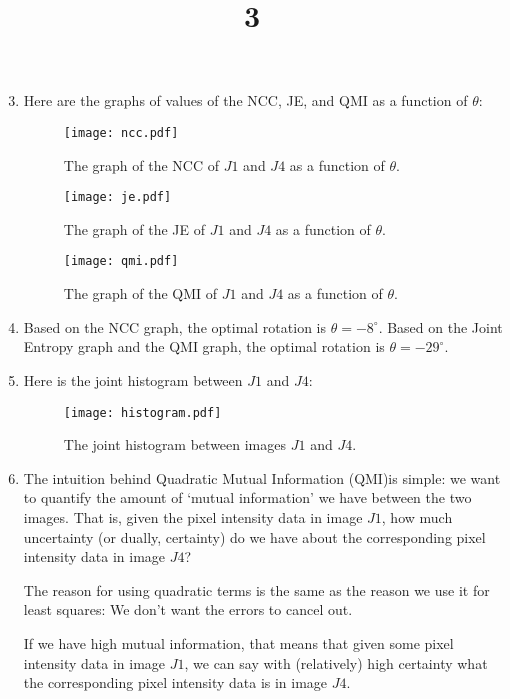 \documentclass[a4paper]{article}
\title{3}
\date{}
\begin{document}
\maketitle

\begin{enumerate}[label=(\alph*)]
\setcounter{enumi}{2}
\item Here are the graphs of values of the NCC, JE, and QMI as a function of $\theta$:
\begin{figure}[H]
\centering
\texttt{[image: ncc.pdf]}
\caption{The graph of the NCC of $J1$ and $J4$ as a function of $\theta$.}
\end{figure}

\begin{figure}[H]
\centering
\texttt{[image: je.pdf]}
\caption{The graph of the JE of $J1$ and $J4$ as a function of $\theta$.}
\end{figure}

\begin{figure}[H]
\centering
\texttt{[image: qmi.pdf]}
\caption{The graph of the QMI of $J1$ and $J4$ as a function of $\theta$.}
\end{figure}

\item Based on the NCC graph, the optimal rotation is $\theta = -8^\circ$. Based on the Joint Entropy graph and the QMI graph, the optimal rotation is $\theta = -29^\circ$.

\item Here is the joint histogram between $J1$ and $J4$:
\begin{figure}[H]
\centering
\texttt{[image: histogram.pdf]}
\caption{The joint histogram between images $J1$ and $J4$.}
\end{figure}

\item The intuition behind Quadratic Mutual Information (QMI)is simple: we want to quantify the amount of `mutual information' we have between the two images. That is, given the pixel intensity data in image $J1$, how much uncertainty (or dually, certainty) do we have about the corresponding pixel intensity data in image $J4$?

The reason for using quadratic terms is the same as the reason we use it for least squares: We don't want the errors to cancel out.

If we have high mutual information, that means that given some pixel intensity data in image $J1$, we can say with (relatively) high certainty what the corresponding pixel intensity data is in image $J4$.


\end{enumerate}
\end{document}
